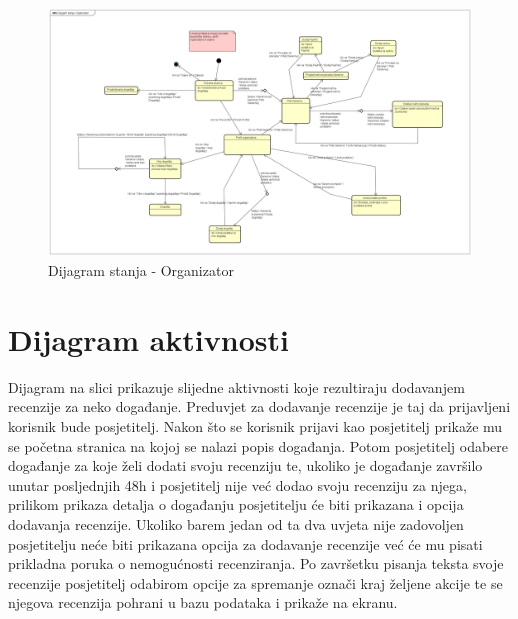 			\medskip
			
			\begin{figure}[H]
				\includegraphics[width=\linewidth]{slike/dijagram_stanja.PNG}
				\centering
				\caption{Dijagram stanja - Organizator}
				\label{fig:dijagramst}
			\end{figure}
			
			\bigskip
			
			
			\eject 
		
		\section{Dijagram aktivnosti}
		
		\normalfont Dijagram na slici prikazuje slijedne aktivnosti koje rezultiraju dodavanjem recenzije za neko događanje. Preduvjet za dodavanje recenzije je taj da prijavljeni korisnik bude posjetitelj. Nakon što se korisnik prijavi kao posjetitelj prikaže mu se početna stranica na kojoj se nalazi popis događanja. Potom posjetitelj odabere događanje za koje želi dodati svoju recenziju te, ukoliko je događanje završilo unutar posljednjih 48h i posjetitelj nije već dodao svoju recenziju za njega, prilikom prikaza detalja o događanju posjetitelju će biti prikazana i opcija dodavanja recenzije. Ukoliko barem jedan od ta dva uvjeta nije zadovoljen posjetitelju neće biti prikazana opcija za dodavanje recenzije već će mu pisati prikladna poruka o nemogućnosti recenziranja. Po završetku pisanja teksta svoje recenzije posjetitelj odabirom opcije za spremanje označi kraj željene akcije te se njegova recenzija pohrani u bazu podataka i prikaže na ekranu. 
		
